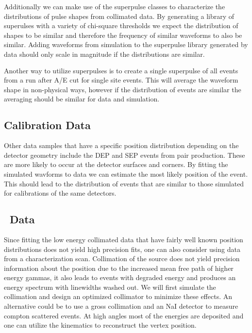 \documentclass[groupedaddress,rmp,amsmath,amssymb,bibnotes,altaffilletter,twocolumn]{revtex4-1}
\begin{document}
Additionally we can make use of the superpulse classes to characterize the distributions of pulse shapes from collimated data. By generating a library of superulses with a variety of chi-square thresholds we expect the distribution of shapes to be similar and therefore the frequency of similar waveforms to also be similar. Adding waveforms from simulation to the superpulse library generated by data should only scale in magnitude if the distributions are similar. 

Another way to utilize superpulses is to create a single superpulse of all events from a run after A/E cut for single site events. This will average the waveform shape in non-physical ways, however if the distribution of events are similar the averaging should be similar for data and simulation. 

\subsection{Calibration Data}

Other data samples that have a specific position distribution depending on the detector geometry include the DEP and SEP events from pair production. These are more likely to occur at the detector surfaces and corners. By fitting the simulated wavforms to data we can estimate the most likely position of the event. This should lead to the distribution of events that are similar to those simulated for calibrations of the same detectors.

\subsection{\cosixty~Data}

Since fitting the low energy collimated data that have fairly well known position distributions does not yield high precision fits, one can also consider using \cosixty data from a characterization scan. Collimation of the \cosixty source does not yield precision information about the position due to the increased mean free path of higher energy gammas, it also leads to events with degraded energy and produces an energy spectrum with linewidths washed out. We will first simulate the collimation and design an optimized collimator to minimize these effects. An alternative could be to use a gross collimation and an NaI detector to measure compton scattered events. At high angles most of the energies are deposited and one can utilize the kinematics to reconstruct the vertex position.  
\end{document}
